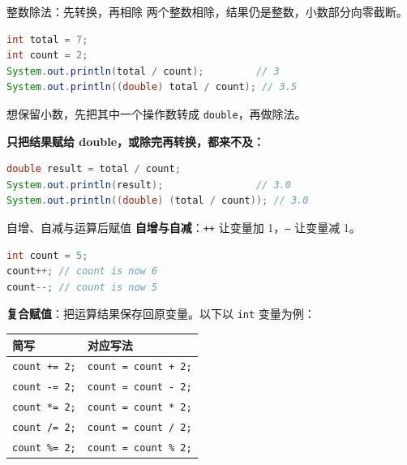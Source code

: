 \documentclass[aspectratio=169]{beamer}
\begin{document}
\begin{frame}[fragile]{整数除法：先转换，再相除}
  两个整数相除，结果仍是整数，小数部分向零截断。
  \begin{lstlisting}[language=Java]
int total = 7;
int count = 2;
System.out.println(total / count);         // 3
System.out.println((double) total / count); // 3.5
  \end{lstlisting}
  想保留小数，先把其中一个操作数转成 \texttt{double}，再做除法。
  \par\medskip
  \textbf{只把结果赋给 double，或除完再转换，都来不及：}
  \begin{lstlisting}[language=Java]
double result = total / count;
System.out.println(result);                // 3.0
System.out.println((double) (total / count)); // 3.0
  \end{lstlisting}
\end{frame}

\begin{frame}[fragile]{自增、自减与运算后赋值}
  \textbf{自增与自减}：\texttt{++} 让变量加 1，\texttt{--} 让变量减 1。
  \begin{lstlisting}[language=Java]
int count = 5;
count++; // count is now 6
count--; // count is now 5
  \end{lstlisting}
  \textbf{复合赋值}：把运算结果保存回原变量。以下以 \texttt{int} 变量为例：
  \begin{center}
    \renewcommand{\arraystretch}{1.1}
    \begin{tabular}{ll}
      \textbf{简写} & \textbf{对应写法} \\
      \hline
      \texttt{count += 2;} & \texttt{count = count + 2;} \\
      \texttt{count -= 2;} & \texttt{count = count - 2;} \\
      \texttt{count *= 2;} & \texttt{count = count * 2;} \\
      \texttt{count /= 2;} & \texttt{count = count / 2;} \\
      \texttt{count \%= 2;} & \texttt{count = count \% 2;} \\
    \end{tabular}
  \end{center}
\end{frame}
\end{document}

